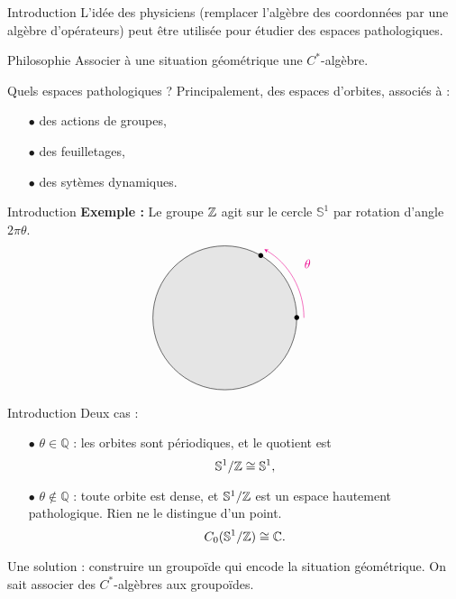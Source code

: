 \begin{frame}{Introduction}
L'idée des physiciens (remplacer l'algèbre des coordonnées par une algèbre d'opérateurs) peut être utilisée pour étudier des espaces pathologiques.
\vspace{0.3 cm}
\begin{block}{Philosophie}
Associer à une situation géométrique une $C^*$-algèbre.
\end{block}
\vspace{0.3 cm}
Quels espaces pathologiques ? Principalement, des espaces d'orbites, associés à :
\begin{itemize}
\item[$\bullet$] des actions de groupes,
\item[$\bullet$] des feuilletages,
\item[$\bullet$] des sytèmes dynamiques.
\end{itemize} 
\end{frame}

\begin{frame}{Introduction}
\textbf{Exemple :} Le groupe $\mathbb Z$ agit sur le cercle $\mathbb S^1$ par rotation d'angle $2\pi\theta$.
\vspace{0.3 cm}
\[\begin{tikzpicture}
\draw[fill = gray!20] (0,0) circle (2) ;
\draw [>=stealth, ->, magenta] (2.2,0)  arc (0:60:2.2); %
\draw[magenta]  (2.3,1.5) node {$\theta$};
\draw  (2,0) node {$\bullet$};
\draw  (1,1.72) node {$\bullet$};
\end{tikzpicture}\]
\end{frame}

\begin{frame}{Introduction}
Deux cas :
\vspace{0.3 cm}
\begin{itemize}
\item[$\bullet$] $\theta\in \mathbb Q$ : les orbites sont périodiques, et le quotient est 
\[\mathbb S^1 / \mathbb Z \cong \mathbb S^1,\] 
\item[$\bullet$] $\theta \notin \mathbb Q$ : toute orbite est dense, et  $\mathbb S^1 / \mathbb Z$ est un espace hautement pathologique. Rien ne le distingue d'un point.
 \[C_0(\mathbb S^1 / \mathbb Z) \cong \mathbb C.\]
\end{itemize}
\vspace{0.3 cm}
Une solution : construire un groupoïde qui encode la situation géométrique. On sait associer des $C^*$-algèbres aux groupoïdes.\\
\end{frame}

